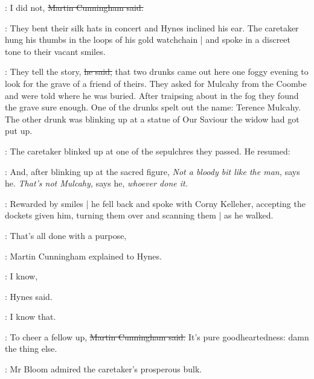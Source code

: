 \cunningham:
I did not,
\sout{Martin Cunningham said.}

:
They bent their silk hats in concert and Hynes inclined his ear.
The caretaker hung his thumbs in the loops of his gold watchchain |
and spoke in a discreet tone to their vacant smiles.

\oconnell:
They tell the story,
\sout{he said,}
that two drunks came out here one foggy evening
to look for the grave of a friend of theirs.
They asked for Mulcahy from the Coombe and were told where he was buried.
After traipsing about in the fog they found the grave sure enough.
One of the drunks spelt out the name:
Terence Mulcahy.
The other drunk was blinking up at a statue of Our Saviour
the widow had got put up.

:
The caretaker blinked up at one of the sepulchres they passed.
He resumed:

\oconnell:
And, after blinking up at the sacred figure,
\emph{Not a bloody bit like the man,} says he.
\emph{That's not Mulcahy,} says he,
\emph{whoever done it.}

:
Rewarded by smiles |
he fell back and spoke with Corny Kelleher,
accepting the dockets given him,
turning them over and scanning them |
as he walked.

\cunningham:
That's all done with a purpose,

:
Martin Cunningham explained to Hynes.

\hynes:
I know,

:
Hynes said.

\hynes:
I know that.

\cunningham:
To cheer a fellow up,
\sout{Martin Cunningham said.}
It's pure goodheartedness:
damn the thing else.

:
Mr Bloom admired the caretaker's prosperous bulk.

